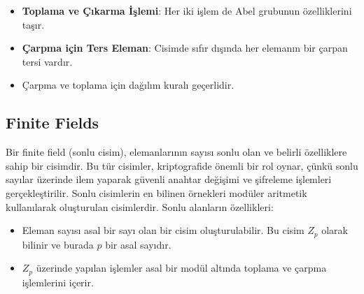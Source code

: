 \begin{itemize}
    \item \textbf{Toplama ve Çıkarma İşlemi}: Her iki işlem de Abel grubunun özelliklerini taşır.
    \item \textbf{Çarpma için Ters Eleman}: Cisimde sıfır dışında her elemanın bir çarpan tersi vardır.
    \item Çarpma ve toplama için dağılım kuralı geçerlidir.
\end{itemize}

\newpage

\subsection{Finite Fields}

Bir finite field (sonlu cisim), elemanlarının sayısı sonlu olan ve belirli özelliklere sahip bir cisimdir. Bu tür cisimler, kriptografide önemli bir rol oynar, çünkü sonlu sayılar üzerinde ilem yaparak güvenli anahtar değişimi ve şifreleme işlemleri gerçekleştirilir. Sonlu cisimlerin en bilinen örnekleri modüler aritmetik kullanılarak oluşturulan cisimlerdir. Sonlu alanların özellikleri:

\begin{itemize}
    \item Eleman sayısı asal bir sayı olan bir cisim oluşturulabilir. Bu cisim $Z_p$ olarak bilinir ve burada $p$ bir asal sayıdır.
    \item $Z_p$ üzerinde yapılan işlemler asal bir modül altında toplama ve çarpma işlemlerini içerir.
\end{itemize}

\newpage